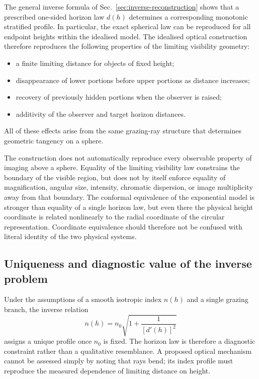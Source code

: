The general inverse formula of Sec.~\ref{sec:inverse-reconstruction} shows that
a prescribed one-sided horizon law $d(h)$ determines a corresponding monotonic
stratified profile. In particular, the exact spherical law can be reproduced
for all endpoint heights within the idealised model. The idealised optical construction therefore reproduces the following
properties of the limiting visibility geometry:
\begin{itemize}
    \item a finite limiting distance for objects of fixed height;
    \item disappearance of lower portions before upper portions as distance
          increases;
    \item recovery of previously hidden portions when the observer is raised;
    \item additivity of the observer and target horizon distances.
\end{itemize}
All of these effects arise from the same grazing-ray structure that determines
geometric tangency on a sphere.

The construction does not automatically reproduce every observable property
of imaging above a sphere. Equality of the limiting visibility law constrains
the boundary of the visible region, but does not by itself enforce equality of
magnification, angular size, intensity, chromatic dispersion, or image
multiplicity away from that boundary. The conformal equivalence of the
exponential model is stronger than equality of a single horizon law, but even
there the physical height coordinate is related nonlinearly to the radial
coordinate of the circular representation. Coordinate equivalence should
therefore not be confused with literal identity of the two physical systems.

\subsection{Uniqueness and diagnostic value of the inverse problem}

Under the assumptions of a smooth isotropic index $n(h)$ and a single grazing
branch, the inverse relation
\begin{equation}
    n(h)=n_0\sqrt{1+\frac{1}{[d'(h)]^2}}
\end{equation}
assigns a unique profile once $n_0$ is fixed. The horizon law is therefore a
diagnostic constraint rather than a qualitative resemblance. A
proposed optical mechanism cannot be assessed simply by noting that rays bend;
its index profile must reproduce the measured dependence of limiting distance
on height.

